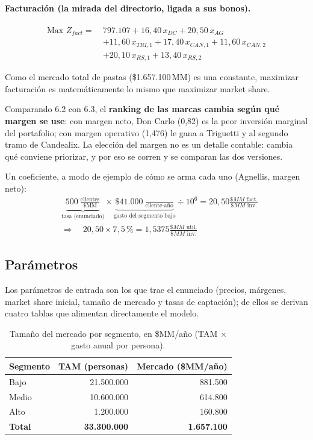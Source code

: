 \documentclass[10pt,a4paper]{article}
\begin{document}
\paragraph{Facturación (la mirada del directorio, ligada a sus bonos).}
\[
\begin{aligned}
\text{Max } Z_{fact} = \ & 797.107
+ 16{,}40\,x_{DC} + 20{,}50\,x_{AG} \\
& + 11{,}60\,x_{TRI,1} + 17{,}40\,x_{CAN,1} + 11{,}60\,x_{CAN,2} \\
& + 20{,}10\,x_{RS,1} + 13{,}40\,x_{RS,2}
\end{aligned}
\]

Como el mercado total de pastas (\$1.657.100\,MM) es una constante, maximizar
facturación es matemáticamente lo mismo que maximizar market share.

Comparando 6.2 con 6.3, el \textbf{ranking de las marcas cambia según qué
margen se use}: con margen neto, Don Carlo (0,82) es la peor inversión
marginal del portafolio; con margen operativo (1,476) le gana a Triguetti y al
segundo tramo de Candealix. La elección del margen no es un detalle contable:
cambia qué conviene priorizar, y por eso se corren y se comparan las dos
versiones.

Un coeficiente, a modo de ejemplo de cómo se arma cada uno (Agnellis, margen
neto):
\[
\begin{aligned}
&\underbrace{500\ \tfrac{\text{clientes}}{\text{\$MM}}}_{\text{tasa (enunciado)}}
\times
\underbrace{\$41.000\ \tfrac{}{\text{cliente-año}}}_{\text{gasto del segmento bajo}}
\div 10^6
= 20{,}50 \tfrac{\$MM\text{ fact.}}{\$MM\text{ inv.}} \\[4pt]
&\Longrightarrow\quad
20{,}50 \times 7{,}5\,\% = 1{,}5375 \tfrac{\$MM\text{ util.}}{\$MM\text{ inv.}}
\end{aligned}
\]

\subsection{Parámetros}
\label{sec:parametros}

Los parámetros de entrada son los que trae el enunciado (precios, márgenes,
market share inicial, tamaño de mercado y tasas de captación); de ellos se
derivan cuatro tablas que alimentan directamente el modelo.

\begin{table}[htbp]
\centering\small
\caption{Tamaño del mercado por segmento, en \$MM/año (TAM $\times$ gasto anual por persona).}
\begin{tabular}{lrr}
\toprule
Segmento & TAM (personas) & Mercado (\$MM/año) \\
\midrule
Bajo  & 21.500.000 & 881.500 \\
Medio & 10.600.000 & 614.800 \\
Alto  &  1.200.000 & 160.800 \\
\midrule
\textbf{Total} & \textbf{33.300.000} & \textbf{1.657.100} \\
\bottomrule
\end{tabular}
\end{table}
\end{document}
